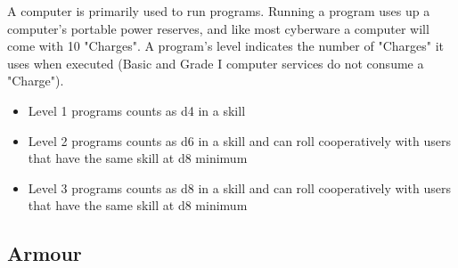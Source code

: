 \begin{multicols}{2}
A computer is primarily used to run programs. Running a program uses up a computer's portable power reserves, and like most cyberware a computer will come with 10 "Charges". A program's level indicates the number of "Charges" it uses when executed (Basic and Grade I computer services do not consume a "Charge").

\begin{itemize}
  \item Level 1 programs counts as d4 in a skill
  \item Level 2 programs counts as d6 in a skill and can roll cooperatively with users that have the same skill at d8 minimum
  \item Level 3 programs counts as d8 in a skill and can roll cooperatively with users that have the same skill at d8 minimum
\end{itemize}


\end{multicols}

\subsection{Armour}

